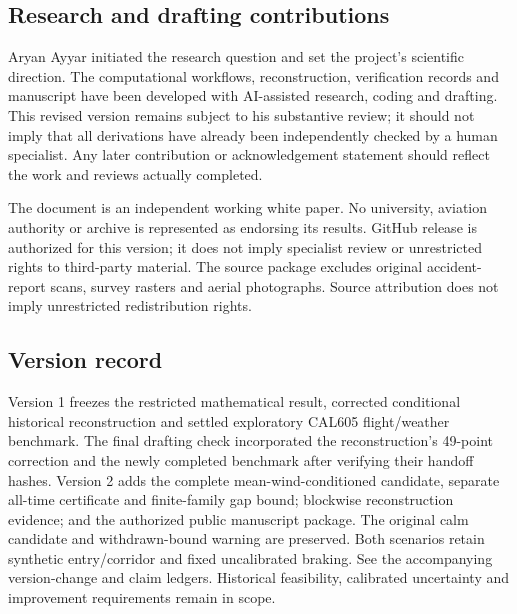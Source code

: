 \subsection{Research and drafting contributions}
Aryan Ayyar initiated the research question and set the project's scientific direction. The computational workflows, reconstruction, verification records and manuscript have been developed with AI-assisted research, coding and drafting. This revised version remains subject to his substantive review; it should not imply that all derivations have already been independently checked by a human specialist. Any later contribution or acknowledgement statement should reflect the work and reviews actually completed.

The document is an independent working white paper. No university, aviation authority or archive is represented as endorsing its results. GitHub release is authorized for this version; it does not imply specialist review or unrestricted rights to third-party material. The source package excludes original accident-report scans, survey rasters and aerial photographs. Source attribution does not imply unrestricted redistribution rights.

\subsection{Version record}
Version 1 freezes the restricted mathematical result, corrected conditional historical reconstruction and settled exploratory CAL605 flight/weather benchmark. The final drafting check incorporated the reconstruction's 49-point correction and the newly completed benchmark after verifying their handoff hashes. Version 2 adds the complete mean-wind-conditioned candidate, separate all-time certificate and finite-family gap bound; blockwise reconstruction evidence; and the authorized public manuscript package. The original calm candidate and withdrawn-bound warning are preserved. Both scenarios retain synthetic entry/corridor and fixed uncalibrated braking. See the accompanying version-change and claim ledgers. Historical feasibility, calibrated uncertainty and improvement requirements remain in scope.
